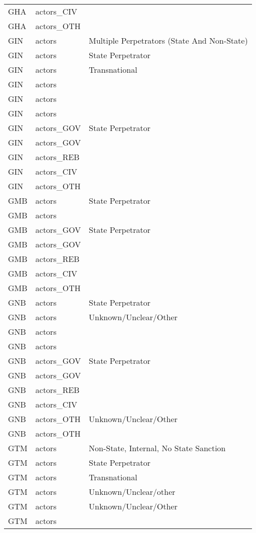 \begin{table}[ht]
\begin{tabular}{lll}
  GHA & actors\_CIV &  \\ 
  GHA & actors\_OTH &  \\ 
  GIN & actors & Multiple Perpetrators (State And Non-State) \\ 
  GIN & actors & State Perpetrator \\ 
  GIN & actors & Transnational \\ 
  GIN & actors &  \\ 
  GIN & actors &  \\ 
  GIN & actors &  \\ 
  GIN & actors\_GOV & State Perpetrator \\ 
  GIN & actors\_GOV &  \\ 
  GIN & actors\_REB &  \\ 
  GIN & actors\_CIV &  \\ 
  GIN & actors\_OTH &  \\ 
  GMB & actors & State Perpetrator \\ 
  GMB & actors &  \\ 
  GMB & actors\_GOV & State Perpetrator \\ 
  GMB & actors\_GOV &  \\ 
  GMB & actors\_REB &  \\ 
  GMB & actors\_CIV &  \\ 
  GMB & actors\_OTH &  \\ 
  GNB & actors & State Perpetrator \\ 
  GNB & actors & Unknown/Unclear/Other \\ 
  GNB & actors &  \\ 
  GNB & actors &  \\ 
  GNB & actors\_GOV & State Perpetrator \\ 
  GNB & actors\_GOV &  \\ 
  GNB & actors\_REB &  \\ 
  GNB & actors\_CIV &  \\ 
  GNB & actors\_OTH & Unknown/Unclear/Other \\ 
  GNB & actors\_OTH &  \\ 
  GTM & actors & Non-State, Internal, No State Sanction \\ 
  GTM & actors & State Perpetrator \\ 
  GTM & actors & Transnational \\ 
  GTM & actors & Unknown/Unclear/other \\ 
  GTM & actors & Unknown/Unclear/Other \\ 
  GTM & actors &  \\ 

\end{tabular}
\end{table}
